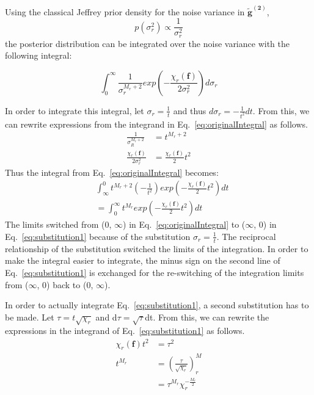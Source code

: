 \documentclass[11pt]{article}
\begin{document}
Using the classical Jeffrey prior density for the noise variance in $\mathbf{\tilde{g}^{(2)}}$,
\begin{equation}\label{eq:noisevariance}
p(\sigma_r^2) \propto \frac{1}{\sigma_r^2}
\end{equation}
the posterior distribution can be integrated over the noise variance with the following integral:

\begin{equation} \label{eq:originalIntegral}
\int_{0}^{\infty} \frac{1}{\sigma_r^{M_r + 2}} exp \left( -\frac{\chi_r(\mathbf{f})}{2\sigma_r^2} \right)d\sigma_r
\end{equation}
 
 In order to integrate this integral, let $\sigma_r = \frac{1}{t}$ and thus $d\sigma_r = -\frac{1}{t^2}dt$. From this, we can rewrite expressions from the integrand in Eq.~\ref{eq:originalIntegral} as follows.
  \begin{equation}
 \begin{split}
 \frac{1}{\sigma_R^{M_r + 2} } & = t^{M_r + 2} \\
 \frac{\chi_r(\mathbf{f})}{2\sigma_r^2} & = \frac{\chi_r(\mathbf{f})}{2} t^2
 \end{split}
 \end{equation}
 Thus the integral from Eq.~\ref{eq:originalIntegral} becomes:
 \begin{equation} \label{eq:substitution1}
 \begin{split}
&  \int_{\infty}^{0} t^{M_r + 2} \left( -\frac{1}{t^2} \right)exp \left( -\frac{\chi_r(\mathbf{f})}{2} t^2 \right) dt \\
& =  \int_{0}^{\infty} t^{M_r}exp\left( -\frac{\chi_r(\mathbf{f})}{2} t^2 \right) dt
 \end{split}
 \end{equation}
 The limits switched from (0, $\infty$) in Eq.~\ref{eq:originalIntegral} to ($\infty$, 0) in Eq.~\ref{eq:substitution1} because of the substitution $\sigma_r = \frac{1}{t}$. The reciprocal relationship of the substitution switched the limits of the integration. In order to make the integral easier to integrate, the minus sign on the second line of Eq.~\ref{eq:substitution1} is exchanged for the re-switching of the integration limits from ($\infty$, 0) back to (0, $\infty$). 
 
 In order to actually integrate Eq.~\ref{eq:substitution1}, a second substitution has to be made. Let $\tau = t\sqrt{\chi_r}$ and d$\tau = \sqrt{\tau}$dt. From this, we can rewrite the expressions in the integrand of Eq.~\ref{eq:substitution1} as follows. 
 \begin{equation}
 \begin{split}
 \chi_r(\mathbf{f}) t^2 & = \tau^2 \\
 t^{M_r} & = {\left( \frac{\tau}{\sqrt{\chi_r}} \right)}^M_r \\
 & = \tau^{M_r}\chi_r^{-\frac{M_r}{2}} 
 \end{split}
 \end{equation}
 
\end{document}

